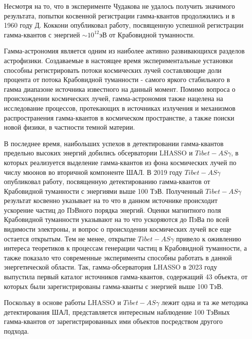 Несмотря на то, что в эксперименте Чудакова не удалось получить значимого результата, попытки косвенной регистрации гамма-квантов продолжились и в 1960 году Д. Коккони опубликовал работу, посвященную успешной регистрации гамма-квантов с энергией $\sim10^{12}$эВ от Крабовидной туманности. 

Гамма-астрономия является одним из наиболее активно развивающихся разделов астрофизики. Создаваемые в настоящее время экспериментальные установки способны регистрировать потоки космических лучей составляющие доли процента от потока Крабовидной туманности - самого яркого стабильного в гамма диапазоне источника известного на данный момент. Помимо вопроса о происхождении космических лучей, гамма-астрономия также нацелена на исследование процессов, протекающих в источниках излучения и механизмов распространения гамма-квантов в космическом пространстве, а также поиски новой физики, в частности темной материи.

В последнее время, наибольших успехов в детектировании гамма-квантов предельно высоких энергий добились обсерватории LHASSO и $Tibet-AS\gamma$, в которых реализуется выделение гамма-квантов из фона космических лучей по числу мюонов во вторичной компоненте ШАЛ. В 2019 году $Tibet-AS\gamma$ опубликовал работу, посвященную детектированию гамма-квантов от Крабовидной туманности с энергиями выше 100 ТэВ\cite{Tibet2019}.  Полученный $Tibet-AS\gamma$ результат косвенно указывает на то что в данном источнике происходит ускорение частиц до ПэВного порядка энергий. Оценки магнитного поля Крабовидной туманности указывают на то что ускоряются до ПэВа по всей видимости электроны, и вопрос о происходении космических лучей все еще остается открытым. Тем не менее, открытие $Tibet-AS\gamma$ привело к оживлению интереса теоретиков к процессам генерации частиц в Крабовидной туманности, а также показало что современные эксперименты способны работать в данной энергетической области. Так, гамма-обсерватория LHASSO в 2023 году выпустила первый каталог источников гамма-квантов, содержащий 43 объекта, от которых были зарегистрированы гамма-кванты с энергией выше 100 ТэВ\cite{Lhaaso_cat2023}.

Поскольку в основе работы LHASSO и $Tibet-AS\gamma$ лежит одна и та же методика детектирования ШАЛ, представляется интересным наблюдение 100 ТэВных гамма-квантов от зарегистрированных ими объектов посредством другого подхода.

